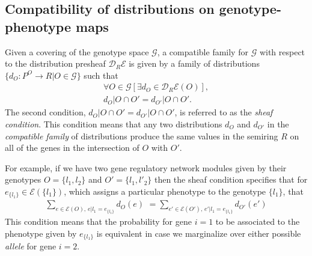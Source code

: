 \documentclass[10pt]{article}
\begin{document}
\subsection*{Compatibility of distributions on genotype-phenotype maps}
Given a covering of the genotype space $\mathcal{G}$, a compatible family for $\mathcal{G}$ with respect to the distribution presheaf $\mathcal{D}_R\mathcal{E}$ is given by a family of distributions $\{d_O \colon P^O \rightarrow R | O \in \mathcal{G}\}$ such that
\begin{eqnarray*}
\forall O \in \mathcal{G} \left[ \exists d_O \in \mathcal{D}_R\mathcal{E}(O) \right],\\
d_O|O \cap O' = d_{O'}|O \cap O'.
\end{eqnarray*}
The second condition, $d_O|O \cap O' = d_{O'}|O \cap O'$, is referred to as the \emph{sheaf condition}. This condition means that any two distributions $d_O$ and $d_{O'}$ in the \emph{compatible family} of distributions produce the same values in the semiring $R$ on all of the genes in the intersection of $O$ with $O'$.

For example, if we have two gene regulatory network modules given by their genotypes $O = \{l_1, l_2\}$ and $O' = \{l_1, l'_2\}$ then the sheaf condition specifies that for $e_{\{l_1\}} \in \mathcal{E}(\{l_1\})$, which assigns a particular phenotype to the genotype $\{l_1\}$, that
\begin{eqnarray}\label{eq:sheafprob}
\sum_{e \in \mathcal{E}(O),\, e|l_1=e_{\{l_1\}}} d_O(e) \,\, = \sum_{e' \in \mathcal{E}(O'),\, e'|l_1=e_{\{l_1\}}} d_{O'}(e')
\end{eqnarray}
This condition means that the probability for gene $i=1$ to be associated to the phenotype given by $e_{\{l_1\}}$ is equivalent in case we marginalize over either possible \emph{allele} for gene $i=2$.
\end{document}
